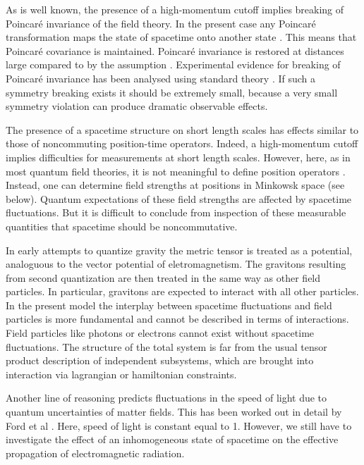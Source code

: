 \documentclass[12pt,a4paper]{article}
\begin{document}
As is well known, the presence of a high-momentum
cutoff implies breaking of Poincar\'e invariance of the
field theory. In the present case
any Poincar\'e transformation \myHighlight{$\Lambda$}\coordHE{} maps the
state \myHighlight{$\Omega$}\coordHE{} of spacetime onto another state \myHighlight{$\Lambda\Omega$}\coordHE{}.
This means that Poincar\'e covariance is maintained.
Poincar\'e invariance is restored at distances large compared to
\coordHE{} by the assumption \coordHE{}.
Experimental evidence for breaking of
Poincar\'e invariance has been analysed using
standard theory \cite {CG99}. If such a symmetry
breaking exists it should be extremely small,
because a very small symmetry violation
can produce dramatic observable effects.


The presence of a spacetime structure on
short length scales has effects similar to those
of noncommuting position-time operators.
Indeed, a high-momentum cutoff implies difficulties
for measurements at short length scales.
However, here, as in most quantum field theories,
it is not meaningful to define
position operators \coordHE{}.
Instead, one can determine field strengths
at positions \coordHE{} in Minkowsk space (see below).
Quantum expectations of these field strengths
are affected by spacetime fluctuations.
But it is difficult to conclude from inspection of these
measurable quantities that spacetime should be
noncommutative.

In early attempts to quantize gravity the metric
tensor \coordHE{} is treated as a potential,
analoguous to the vector potential of eletromagnetism.
The gravitons resulting from second quantization
are then treated in the same way as other field particles.
In particular, gravitons are expected to interact with all other
particles. In the present model the interplay between
spacetime fluctuations and field particles is more fundamental
and cannot be described in terms of interactions.
Field particles like photons or electrons cannot
exist without spacetime fluctuations. The structure
of the total system is far from the usual tensor product
description of independent subsystems, which are brought
into interaction via lagrangian or hamiltonian constraints.

Another line of reasoning predicts fluctuations in the speed
of light due to quantum uncertainties of matter fields.
This has been worked out in detail by Ford et al
\cite {FLH94,FS96}. Here, speed of light is constant equal to 1.
However, we still have to investigate the effect of an inhomogeneous state
of spacetime on the effective propagation of electromagnetic radiation.
\end{document}
